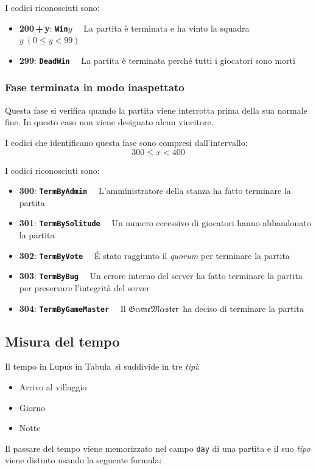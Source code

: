 \documentclass[10pt,a4paper]{article}
\newcommand{\GameMaster}{$\mathfrak{G\alpha me} \allowbreak \mathfrak{M\alpha ster}$}
\newcommand{\lupus}{Lupus in Tabula}
\newcommand{\gamestatus}[3]{
\textbf{#1}: \textbf{\texttt{#2}}$\quad$ #3
}
\begin{document}
I codici riconosciuti sono:
\begin{itemize}
\item \gamestatus{200\,+\,y}{Win$y$}{La partita è terminata e ha vinto la squadra $y\ (0\le y < 99)$}
\item \gamestatus{299}{DeadWin}{La partita è terminata perché tutti i giocatori sono morti}
\end{itemize}

\subsubsection{Fase terminata in modo inaspettato}
Questa fase si verifica quando la partita viene interrotta prima della sua normale fine. In questo caso non viene designato alcun vincitore.

I codici che identificano questa fase sono compresi dall'intervallo:
\[
	300 \le x < 400
\]

I codici riconosciuti sono:
\begin{itemize}
\item \gamestatus{300}{TermByAdmin}{L'amministratore della stanza ha fatto terminare la partita}
\item \gamestatus{301}{TermBySolitude}{Un numero eccessivo di giocatori hanno abbandonato la partita}
\item \gamestatus{302}{TermByVote}{\'E stato raggiunto il \emph{quorum} per terminare la partita}
\item \gamestatus{303}{TermByBug}{Un errore interno del server ha fatto terminare la partita per preservare l'integrità del server}
\item \gamestatus{304}{TermByGameMaster}{Il \GameMaster\ ha deciso di terminare la partita}
\end{itemize}

\subsection{Misura del tempo}
Il tempo in \lupus\ si suddivide in tre \emph{tipi}:
\begin{itemize}
\item Arrivo al villaggio
\item Giorno
\item Notte
\end{itemize}

Il passare del tempo viene memorizzato nel campo \texttt{day} di una partita e il suo \emph{tipo} viene distinto usando la seguente formula:
\end{document}
